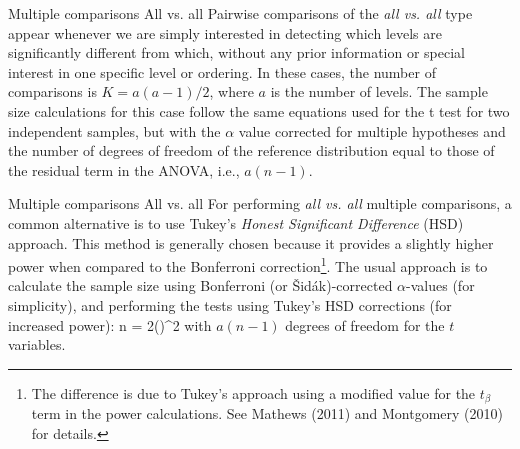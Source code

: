 \documentclass[t]{beamer}
\begin{document}

\begin{ftst}
{Multiple comparisons}
{All vs. all}
Pairwise comparisons of the \textit{all vs. all} type appear whenever we are simply interested in detecting which levels are significantly different from which, without any prior information or special interest in one specific level or ordering.
\vone
In these cases, the number of comparisons is $K=a(a-1)/2$, where $a$ is the number of levels.
\vone
The sample size calculations for this case follow the same equations used for the t test for two independent samples, but with the $\alpha$ value corrected for multiple hypotheses and the number of degrees of freedom of the reference distribution equal to those of the residual term in the ANOVA, i.e., $a(n-1)$.
\end{ftst}


\begin{ftst}
{Multiple comparisons}
{All vs. all}
For performing \textit{all vs. all} multiple comparisons, a common alternative is to use Tukey's \textit{Honest Significant Difference} (HSD) approach. This method is generally chosen because it provides a slightly higher power when compared to the Bonferroni correction\footnote[4]{\tiny The difference is due to Tukey's approach using a modified value for the $t_{\beta}$ term in the power calculations. See Mathews (2011) and Montgomery (2010) for details.}. 
\vhalf
The usual approach is to calculate the sample size using Bonferroni (or \v{S}id\'ak)-corrected $\alpha$-values (for simplicity), and performing the tests using Tukey's HSD corrections (for increased power):
\vhalf
\beqs
n = 2\left(\right)^2
\eqs
\vhalf
\noindent with $a(n-1)$ degrees of freedom for the $t$ variables.
\end{ftst}

\end{document}
